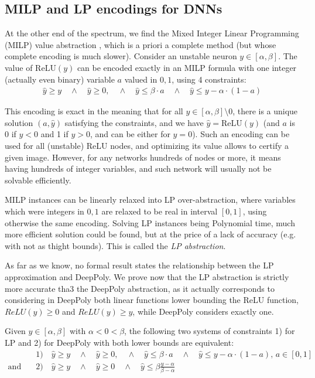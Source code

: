 \documentclass{llncs}
\newcommand{\ReLU}{\mathrm{ReLU}}
\begin{document}
\subsection{MILP and LP encodings for DNNs}

At the other end of the spectrum, we find the Mixed Integer Linear Programming (MILP) value abstraction \cite{MILP}, which is a priori a complete method (but whose complete encoding is much slower). 
Consider an unstable neuron $y \in[\alpha,\beta]$. The value of $\ReLU(y)$ can be encoded exactly in an MILP formula with one integer (actually even binary) variable $a$ valued in ${0,1}$, using 4 constraints:
\vspace{-0.1cm}
\begin{align*}
	\hat{y} \geq y \quad \wedge \quad \hat{y} \geq 0, \quad \wedge \quad \hat{y} \leq \beta \cdot a \quad \wedge \quad \hat{y} \leq y-\alpha \cdot (1-a)
\end{align*}

This encoding is exact in the meaning that \cite{MILP} for all $y \in [\alpha,\beta] \setminus 0$, there is a unique solution $(a,\hat{y})$ satisfying the constraints, and we have $\hat{y}=\ReLU(y)$ (and $a$ is 0 if $y < 0$ and 1 if $y>0$, and can be either for $y=0$). Such an encoding can be used for all (unstable) ReLU nodes, and optimizing its value allows to certify a given image. However, for any networks hundreds of nodes or more, it means having hundreds of integer variables, and such network will usually not be solvable efficiently.

MILP instances can be linearly relaxed into LP over-abstraction, where variables which were integers in 
${0,1}$ are relaxed to be real in interval $[0,1]$, using otherwise the same encoding. 
Solving LP instances being Polynomial time, much more efficient solution could be found, but at the price of a lack of accuracy (e.g. with not as thight bounds). This is called the {\em LP abstraction}.

As far as we know, no formal result states the relationship between the LP approximation and DeepPoly.
We prove now that the LP abstraction is strictly more accurate tha3 the DeepPoly abstraction, as it actually corresponds to considering in DeepPoly both linear functions lower bounding the ReLU function, $ReLU(y) \geq 0$ and $ReLU(y) \geq y$, while DeepPoly considers exactly one.

\begin{proposition}
	\label{LP}
 Given $y \in [\alpha,\beta]$ with $\alpha < 0 < \beta$, the following two systems of constraints 
 1) for LP and 2) for DeepPoly with both lower bounds are equivalent:
 \vspace{-0.3cm}
 \begin{align*}
	 & 1) \quad \hat{y} \geq y \quad \wedge \quad \hat{y} \geq 0, \quad \wedge \quad \hat{y} \leq \beta \cdot a \quad \wedge \quad \hat{y} \leq y-\alpha \cdot (1-a), \, a \in [0,1] \\
	 \text{and} \quad  & 2)  \quad \hat{y} \geq y \quad \wedge \quad \hat{y} \geq 0 \quad \wedge \quad \hat{y} \leq \beta \frac{y-\alpha}{\beta-\alpha}
\end{align*} 
\end{proposition}
\end{document}
